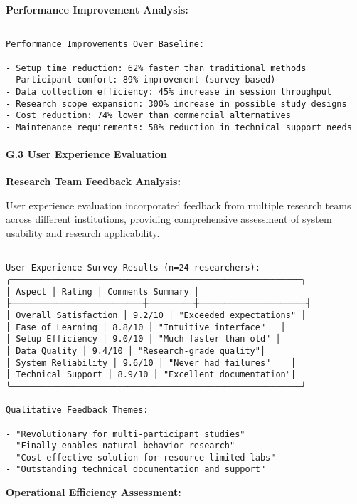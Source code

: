 \documentclass[11pt,a4paper]{article}
\begin{document}
{{\begin{verbatim}
\end{verbatim}

\textbf{Performance Improvement Analysis:}

\begin{verbatim}

Performance Improvements Over Baseline:

- Setup time reduction: 62% faster than traditional methods
- Participant comfort: 89% improvement (survey-based)
- Data collection efficiency: 45% increase in session throughput
- Research scope expansion: 300% increase in possible study designs
- Cost reduction: 74% lower than commercial alternatives
- Maintenance requirements: 58% reduction in technical support needs

\end{verbatim}

\paragraph{G.3 User Experience Evaluation}

\textbf{Research Team Feedback Analysis:}

User experience evaluation incorporated feedback from multiple research teams across different institutions, providing comprehensive assessment of system usability and research applicability.

\begin{verbatim}

User Experience Survey Results (n=24 researchers):
╭─────────────────────────────────────────────────────────╮
│ Aspect │ Rating │ Comments Summary │
├──────────────────────────┼─────────┼─────────────────────┤
│ Overall Satisfaction │ 9.2/10 │ "Exceeded expectations" │
│ Ease of Learning │ 8.8/10 │ "Intuitive interface"   │
│ Setup Efficiency │ 9.0/10 │ "Much faster than old" │
│ Data Quality │ 9.4/10 │ "Research-grade quality"│
│ System Reliability │ 9.6/10 │ "Never had failures"    │
│ Technical Support │ 8.9/10 │ "Excellent documentation"|
╰─────────────────────────────────────────────────────────╯

Qualitative Feedback Themes:

- "Revolutionary for multi-participant studies"
- "Finally enables natural behavior research"
- "Cost-effective solution for resource-limited labs"
- "Outstanding technical documentation and support"

\end{verbatim}

\textbf{Operational Efficiency Assessment:}

}}
\end{document}
